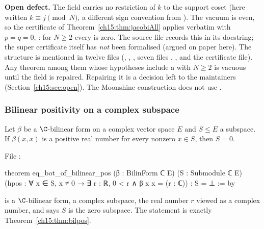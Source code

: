 \begin{warning}
\textbf{Open defect.} The field  carries no restriction of $k$ to the support coset
(here written $k\equiv j\pmod N$, a different sign convention from ). The vacuum
is even, so the certificate of Theorem~\ref{ch15:thm:jacobiAll} applies verbatim with $p=q=0$,
: for $N\ge 2$ every  is zero. The source file
 records this in its docstring; the
super certificate itself has \emph{not} been formalised (argued on paper here). The structure is
mentioned in twelve files (,
, ,
seven files , , and the certificate file). Any theorem among them
whose hypotheses include a  with $N\ge2$ is vacuous until the field is
repaired. Repairing it is a decision left to the maintainers (Section~\ref{ch15:sec:open}). The
Moonshine construction does not use .
\end{warning}

\subsubsection{Bilinear positivity on a complex subspace}

\begin{theorem}\label{ch15:thm:bilpos}
Let $\beta$ be a $\C$-bilinear form on a complex vector space $E$ and $S\le E$ a subspace. If
$\beta(x,x)$ is a positive real number for every nonzero $x\in S$, then $S=0$.
\end{theorem}

File :
\begin{leancode}
theorem eq_bot_of_bilinear_pos (β : BilinForm ℂ E) (S : Submodule ℂ E)
    (hpos : ∀ x ∈ S, x ≠ 0 → ∃ r : ℝ, 0 < r ∧ β x x = (r : ℂ)) : S = ⊥ := by
\end{leancode}

\begin{dictionary}
 is a $\C$-bilinear form,  a complex subspace,
 the real number $r$ viewed as a complex number, and  says $S$ is the
zero subspace. The statement is exactly Theorem~\ref{ch15:thm:bilpos}.
\end{dictionary}

